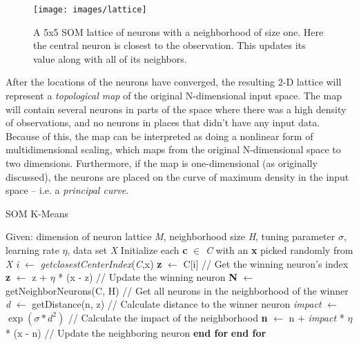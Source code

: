 \documentclass{l4proj}
\begin{document}
\begin{figure}[H]
	\centering
    \label{somLattice}
    \texttt{[image: images/lattice]}
    \caption{A 5x5 SOM lattice of neurons with a neighborhood of size one. Here the central neuron is closest to the observation. This updates its value along with all of its neighbors.} 
\end{figure}

After the locations of the neurons have converged, the resulting 2-D lattice will represent a \textit{topological map} of the original N-dimensional input space. The map will contain several neurons in parts of the space where there was a high density of observations, and no neurons in places that didn't have any input data. Because of this, the map can be interpreted as doing a nonlinear form of multidimensional scaling, which maps from the original N-dimensional space to two dimensions\cite{MLIntro}. Furthermore, if the map is one-dimensional (as originally discussed), the neurons are placed on the curve of maximum density in the input space -- i.e. a \textit{principal curve}\cite{SOM}.

\begin{algorithm}[H]
\caption{SOM K-Means}\label{som-alg}
\begin{algorithmic}[1]
\State Given: dimension of neuron lattice \textit{M}, neighborhood size \textit{H},
\State \hspace{1.1cm} tuning parameter $\sigma$, learning rate $\eta$, data set \textit{X}
\State Initialize each \textbf{c} $\in$ \textit{C} with an \textbf{x} picked randomly from \textit{X}
    \State \textit{i}  $\gets$ \textit{getclosestCenterIndex}(\textit{C},x)
    \State \textbf{z}  $\gets$ C[i] \hspace{3.85cm} // Get the winning neuron's index
    \State \textbf{z} $\gets$ z + $\eta$ * (x - z) \hspace{2.35cm} // Update the winning neuron
    \State \textbf{N} $\gets$ getNeighborNeurons(C, H) \hspace{0.1cm} // Get all neurons in the neighborhood of the winner
        \State \textit{d} $\gets$ getDistance(n, z) \hspace{1.3cm} // Calculate distance to the winner neuron
        \State \textit{impact} $\gets$ $\exp(\sigma * d^2)$ \hspace{1.15cm} // Calculate the impact of the neighborhood
        \State \textbf{n} $\gets$ n + \textit{impact} * $\eta$ * (x - n) \hspace{0.3cm} // Update the neighboring neuron
    \EndFor
    \State \textbf{end for}
\EndFor
\State \textbf{end for}
\end{algorithmic}
\end{algorithm}
\end{document}
